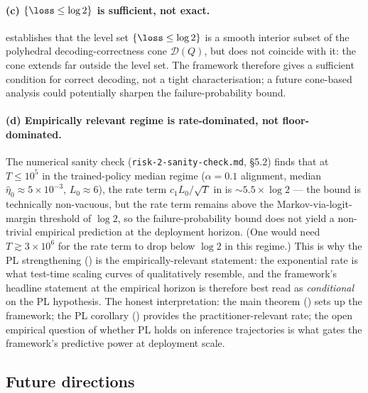 \paragraph{(c) $\{\loss \le \log 2\}$ is sufficient, not exact.}
 establishes that the level set
$\{\loss \le \log 2\}$ is a smooth interior subset of the polyhedral
decoding-correctness cone $\mathcal D(Q)$, but does not coincide with
it: the cone extends far outside the level set. The framework therefore
gives a sufficient condition for correct decoding, not a tight
characterisation; a future cone-based analysis could potentially
sharpen the failure-probability bound.

\paragraph{(d) Empirically relevant regime is rate-dominated, not floor-dominated.}
The numerical sanity check (\texttt{risk-2-sanity-check.md}, \S 5.2)
finds that at $T \le 10^5$ in the trained-policy median regime
($\alpha = 0.1$ alignment, median $\hat\eta_0 \approx 5 \times 10^{-3}$,
$L_0 \approx 6$), the rate term $c_1 L_0/\sqrt T$ in
 is $\sim 5.5 \times \log 2$ — the bound is
technically non-vacuous, but the rate term remains above the
Markov-via-logit-margin threshold of $\log 2$, so the
failure-probability bound  does not yield a
non-trivial empirical prediction at the deployment horizon. (One would
need $T \gtrsim 3 \times 10^6$ for the rate term to drop below $\log 2$
in this regime.) This is why the PL strengthening
() is the empirically-relevant statement:
the exponential rate is what test-time scaling curves of
\cite{openai2024o1, deepseek2025r1} qualitatively resemble, and the
framework's headline statement at the empirical horizon is therefore
best read as \emph{conditional} on the PL hypothesis. The honest interpretation: the main theorem
() sets up the framework; the PL
corollary () provides the
practitioner-relevant rate; the open empirical question of whether PL
holds on inference trajectories is what gates the framework's predictive
power at deployment scale.

\subsection{Future directions}
\label{sec:discussion_future}

